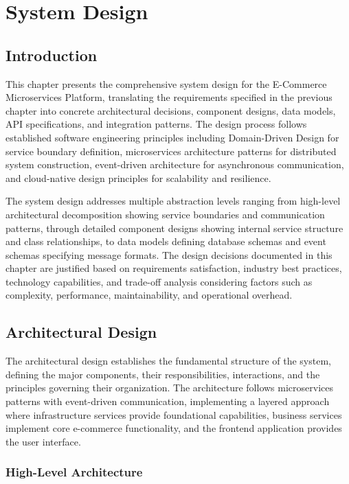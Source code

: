 \chapter{System Design}

\section{Introduction}

This chapter presents the comprehensive system design for the E-Commerce Microservices Platform, translating the requirements specified in the previous chapter into concrete architectural decisions, component designs, data models, API specifications, and integration patterns. The design process follows established software engineering principles including Domain-Driven Design for service boundary definition, microservices architecture patterns for distributed system construction, event-driven architecture for asynchronous communication, and cloud-native design principles for scalability and resilience.

The system design addresses multiple abstraction levels ranging from high-level architectural decomposition showing service boundaries and communication patterns, through detailed component designs showing internal service structure and class relationships, to data models defining database schemas and event schemas specifying message formats. The design decisions documented in this chapter are justified based on requirements satisfaction, industry best practices, technology capabilities, and trade-off analysis considering factors such as complexity, performance, maintainability, and operational overhead.

\section{Architectural Design}

The architectural design establishes the fundamental structure of the system, defining the major components, their responsibilities, interactions, and the principles governing their organization. The architecture follows microservices patterns with event-driven communication, implementing a layered approach where infrastructure services provide foundational capabilities, business services implement core e-commerce functionality, and the frontend application provides the user interface.

\subsection{High-Level Architecture}


